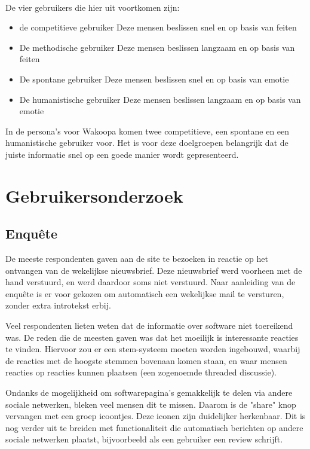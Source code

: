 \documentclass[a4paper, 10pt, pdftex]{report}
\begin{document}
      \paragraph{}De vier gebruikers die hier uit voortkomen zijn:

      \begin{itemize}
        \item de competitieve gebruiker
          Deze mensen beslissen snel en op basis van feiten
        \item De methodische gebruiker
          Deze mensen beslissen langzaam en op basis van feiten
        \item De spontane gebruiker
          Deze mensen beslissen snel en op basis van emotie
        \item De humanistische gebruiker
          Deze mensen beslissen langzaam en op basis van emotie
      \end{itemize}

      In de persona's voor Wakoopa komen twee competitieve, een spontane en een humanistische gebruiker voor. Het is voor deze doelgroepen belangrijk dat de juiste informatie snel op een goede manier wordt gepresenteerd.

    \section{Gebruikersonderzoek}
      \subsection{Enqu\^ete}
        De meeste respondenten gaven aan de site te bezoeken in reactie op het ontvangen van de wekelijkse nieuwsbrief. Deze nieuwsbrief werd voorheen met de hand verstuurd, en werd daardoor soms niet verstuurd. Naar aanleiding van de enqu\^ete is er voor gekozen om automatisch een wekelijkse mail te versturen, zonder extra introtekst erbij.

        Veel respondenten lieten weten dat de informatie over software niet toereikend was. De reden die de meesten gaven was dat het moeilijk is interessante reacties te vinden. Hiervoor zou er een stem-systeem moeten worden ingebouwd, waarbij de reacties met de hoogste stemmen bovenaan komen staan, en waar mensen reacties op reacties kunnen plaatsen (een zogenoemde threaded discussie).

        Ondanks de mogelijkheid om softwarepagina's gemakkelijk te delen via andere sociale netwerken, bleken veel mensen dit te missen. Daarom is de "share" knop vervangen met een groep icoontjes. Deze iconen zijn duidelijker herkenbaar. Dit is nog verder uit te breiden met functionaliteit die automatisch berichten op andere sociale netwerken plaatst, bijvoorbeeld als een gebruiker een review schrijft.
\end{document}
